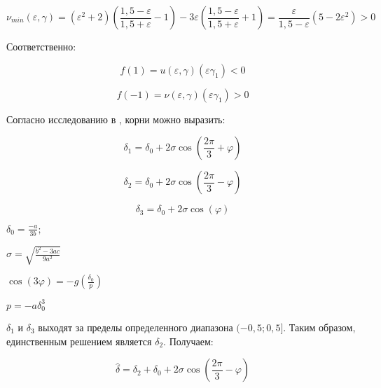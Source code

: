 \begin{equation}
	\label{eq:equation53}
	\nu _{min}(\varepsilon, \gamma) =
	\left( {\varepsilon^2+2} \right) 
	\left( {\frac{1,5-\varepsilon}{1,5+\varepsilon}-1} \right) - 3 \varepsilon 
	\left( {\frac{1,5-\varepsilon}{1,5+\varepsilon}+1} \right) = \frac{\varepsilon}{1,5-\varepsilon}(5-2\varepsilon^2) > 0
\end{equation}

Соответственно:

\begin{equation}
	\label{eq:equation54}
	f(1) = u(\varepsilon, \gamma)(\varepsilon \gamma_1) <0
\end{equation}

\begin{equation}
	\label{eq:equation55}
	f(-1) = \nu(\varepsilon, \gamma)(\varepsilon \gamma_1) > 0
\end{equation}

Согласно исследованию в \cite{nickalls1993new}, корни можно выразить:


\begin{equation}
	\label{eq:equation56}
	\delta_1 = 
	\delta_0 + 2 \sigma \cos \left({\frac{2 \pi}{3}} + \varphi  \right) 
\end{equation}

\begin{equation}
	\label{eq:equation57}
	\delta_2 = 
	\delta_0 + 2 \sigma \cos \left({\frac{2 \pi}{3}} - \varphi  \right) 
\end{equation}

\begin{equation}
	\label{eq:equation58}
	\delta_3 = 
	\delta_0 + 2 \sigma \cos (\varphi) 
\end{equation}

$\delta_0 = \frac{-a}{3b};$

$\sigma = \sqrt{\frac{b^2 - 3ac}{9a^2}}$

$\cos(3 \varphi) = - g \left( {\frac{\delta_0}{p}}
\right) $

$p = -a \delta_0 ^3$

$\delta_1$ и $\delta_3$ выходят за пределы определенного диапазона $(-0,5;0,5]$. Таким образом, единственным решением является $\delta_2 $. Получаем:

\begin{equation}
	\label{eq:equation59}
	\hat{\delta} = \delta_2 + \delta_0 + 2 \sigma \cos \left({\frac{2 \pi}{3} - \varphi} \right) 
\end{equation}

